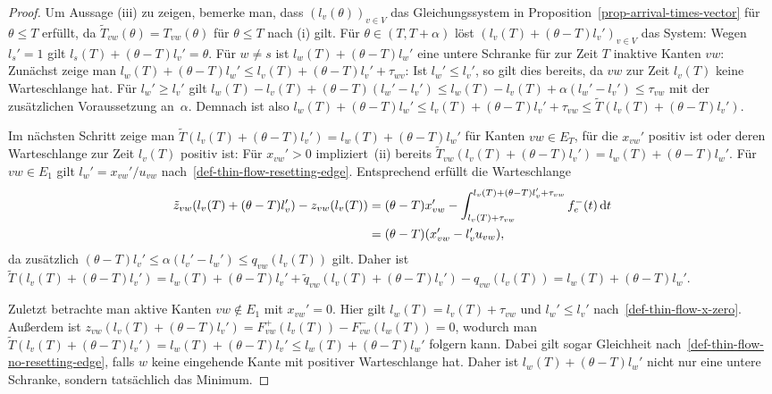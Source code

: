 \begin{proof}
	Um Aussage (iii) zu zeigen, bemerke man, dass $(l_v(\theta))_{v\in V}$ das Gleichungssystem in Proposition~\ref{prop-arrival-times-vector} für $\theta \leq T$ erfüllt, da $\tilde{T}_{vw}(\theta) = T_{vw}(\theta)$ für $\theta\leq T$ nach (i) gilt.
	Für $\theta \in (T, T+\alpha)$ löst $(l_v(T) + (\theta - T)l_v')_{v\in V}$  das System:
	Wegen $l_s' = 1$ gilt $l_s(T) + (\theta - T)l_v' = \theta$.
	Für $w\neq s$ ist $l_w(T) + (\theta - T) l_w'$ eine untere Schranke für zur Zeit $T$ inaktive Kanten $vw$:
	Zunächst zeige man $l_w(T) + (\theta - T)l_w' \leq l_v(T) + (\theta - T)l_v' + \tau_{wv}$:
	Ist $l_w' \leq l_v'$, so gilt dies bereits, da $vw$ zur Zeit $l_v(T)$ keine Warteschlange hat.
	Für $l_w' \geq l_v'$ gilt $l_w(T) - l_v(T) + (\theta - T) (l_w' - l_v') \leq l_w(T) - l_v(T) + \alpha (l_w' - l_v') \leq \tau_{vw}$ mit der zusätzlichen Voraussetzung an~$\alpha$.
	Demnach ist also $l_w(T) + (\theta - T) l_w' \leq l_v(T) + (\theta - T) l_v' + \tau_{vw} \leq \tilde{T}(l_v(T) + (\theta - T) l_v')$.
	
	Im nächsten Schritt zeige man $\tilde{T}(l_v(T) + (\theta - T)l_v') = l_w(T) + (\theta - T) l_w'$ für Kanten $vw\in E_T$, für die $x_{vw}'$ positiv ist oder deren Warteschlange zur Zeit $l_v(T)$ positiv ist:
	Für $x_{vw}' > 0$ impliziert~(ii) bereits $\tilde{T}_{vw}(l_v(T) + (\theta-T)l_v') = l_w(T) + (\theta - T) l_w'$.
	Für $vw\in E_1$ gilt $l_w' = x_{vw}' / u_{vw}$ nach~\ref{def-thin-flow-resetting-edge}.
	Entsprechend erfüllt die Warteschlange
	\begin{align*}
	\tilde{z}_{vw}(l_v(T) + (\theta - T)l_v') - z_{vw}(l_v(T)) &= (\theta - T) x_{vw}' - \int_{l_v(T) + \tau_{vw}}^{l_v(T) + (\theta - T) l_v' + \tau_{vw}} f_e^-(t) \mathop{}\!\mathrm{d} t \\
	&= (\theta - T) (x_{vw}' -l_v' u_{vw}),
	\end{align*}
	da zusätzlich $(\theta-T) l_v' \leq \alpha (l_v' - l_w') \leq q_{vw}(l_v(T))$ gilt.
	Daher ist $\tilde{T}(l_v(T) + (\theta - T)l_v') = l_w(T) + (\theta - T) l_v'  + \tilde{q}_{vw}(l_v(T) + (\theta - T)l_v')- q_{vw}(l_v(T)) = l_w(T) + (\theta - T) l_w'$.
	
	Zuletzt betrachte man aktive Kanten $vw\notin E_1$ mit $x_{vw}' = 0$.
	Hier gilt $l_w(T) = l_v(T) + \tau_{vw}$ und $l_w' \leq l_v'$ nach~\ref{def-thin-flow-x-zero}.
	Außerdem ist $z_{vw}(l_v(T) + (\theta - T) l_v') = F_{vw}^+(l_v(T)) - F_{vw}^-(l_w(T)) = 0$, wodurch man $\tilde{T}(l_v(T) + (\theta - T) l_v') = l_w(T) + (\theta - T)l_v' \leq l_w(T) + (\theta - T) l_w'$ folgern kann.
	Dabei gilt sogar Gleichheit nach~\ref{def-thin-flow-no-resetting-edge}, falls $w$ keine eingehende Kante mit positiver Warteschlange hat.
	Daher ist $l_w(T)+(\theta - T) l_w'$ nicht nur eine untere Schranke, sondern tatsächlich das Minimum.
	

\end{proof}

